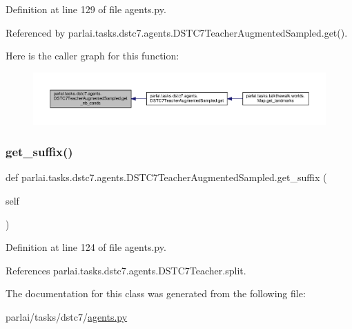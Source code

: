 Definition at line 129 of file agents.\+py.



Referenced by parlai.\+tasks.\+dstc7.\+agents.\+D\+S\+T\+C7\+Teacher\+Augmented\+Sampled.\+get().

Here is the caller graph for this function\+:
\nopagebreak
\begin{figure}[H]
\begin{center}
\leavevmode
\includegraphics[width=350pt]{classparlai_1_1tasks_1_1dstc7_1_1agents_1_1DSTC7TeacherAugmentedSampled_a8be3cd7226a4c0c61fe422cb47d26ccc_icgraph}
\end{center}
\end{figure}
\mbox{\label{classparlai_1_1tasks_1_1dstc7_1_1agents_1_1DSTC7TeacherAugmentedSampled_ab52133c4ddb36400b28221e359f504e3}} 
\subsubsection{\texorpdfstring{get\+\_\+suffix()}{get\_suffix()}}
{\footnotesize\ttfamily def parlai.\+tasks.\+dstc7.\+agents.\+D\+S\+T\+C7\+Teacher\+Augmented\+Sampled.\+get\+\_\+suffix (\begin{DoxyParamCaption}\item[{}]{self }\end{DoxyParamCaption})}



Definition at line 124 of file agents.\+py.



References parlai.\+tasks.\+dstc7.\+agents.\+D\+S\+T\+C7\+Teacher.\+split.



The documentation for this class was generated from the following file\+:\begin{DoxyCompactItemize}
\item 
parlai/tasks/dstc7/\hyperlink{parlai_2tasks_2dstc7_2agents_8py}{agents.\+py}\end{DoxyCompactItemize}
